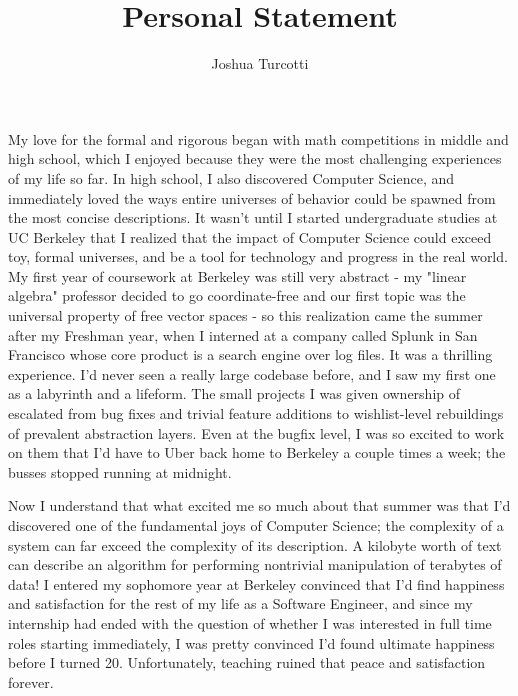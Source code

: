 \documentclass{nsf-grfp}
\title{Personal Statement}
\author{Joshua Turcotti}
\begin{document}
\maketitle
{}

My love for the formal and rigorous began with math competitions in middle and high school, which I enjoyed because they were the most challenging experiences of my life so far. In high school, I also discovered Computer Science, and immediately loved the ways entire universes of behavior could be spawned from the most concise descriptions. It wasn't until I started undergraduate studies at UC Berkeley that I realized that the impact of Computer Science could exceed toy, formal universes, and be a tool for technology and progress in the real world. My first year of coursework at Berkeley was still very abstract - my "linear algebra" professor decided to go coordinate-free and our first topic was the universal property of free vector spaces - so this realization came the summer after my Freshman year, when I interned at a company called Splunk in San Francisco whose core product is a search engine over log files. It was a thrilling experience. I'd never seen a really large codebase before, and I saw my first one as a labyrinth and a lifeform. The small projects I was given ownership of escalated from bug fixes and trivial feature additions to wishlist-level rebuildings of prevalent abstraction layers. Even at the bugfix level, I was so excited to work on them that I'd have to Uber back home to Berkeley a couple times a week; the busses stopped running at midnight. 

Now I understand that what excited me so much about that summer was that I'd discovered one of the fundamental joys of Computer Science; the complexity of a system can far exceed the complexity of its description. A kilobyte worth of text can describe an algorithm for performing nontrivial manipulation of terabytes of data! I entered my sophomore year at Berkeley convinced that I'd find happiness and satisfaction for the rest of my life as a Software Engineer, and since my internship had ended with the question of whether I was interested in full time roles starting immediately, I was pretty convinced I'd found ultimate happiness before I turned 20. Unfortunately, teaching ruined that peace and satisfaction forever.
\end{document}
